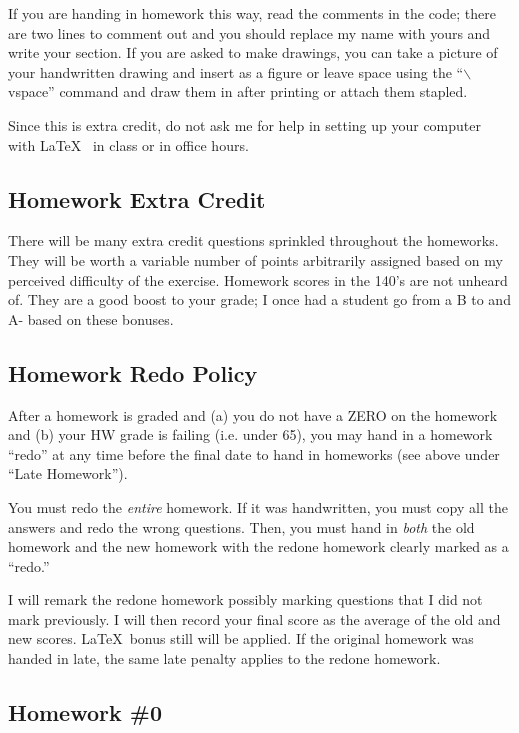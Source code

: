 \documentclass[12pt]{article}
\newcommand{\qu}[1]{``#1''}
\begin{document}
If you are handing in homework this way, read the comments in the code; there are two lines to comment out and you should replace my name with yours and write your section. If you are asked to make drawings, you can take a picture of your handwritten drawing and insert as a figure or leave space using the \qu{$\backslash$vspace} command and draw them in after printing or attach them stapled.

Since this is extra credit, do not ask me for help in setting up your computer with \LaTeX~ in class or in office hours.

\subsection*{Homework Extra Credit}

There will be many extra credit questions sprinkled throughout the homeworks. They will be worth a variable number of points arbitrarily assigned based on my perceived difficulty of the exercise. Homework scores in the 140's are not unheard of. They are a good boost to your grade; I once had a student go from a B to and A- based on these bonuses.

\subsection*{Homework Redo Policy}

After a homework is graded and (a) you do not have a ZERO on the homework and (b) your HW grade is failing (i.e. under 65), you may hand in a homework \qu{redo} at any time before the final date to hand in homeworks (see above under \qu{Late Homework}). 

You must redo the \textit{entire} homework. If it was handwritten, you must copy all the answers and redo the wrong questions. Then, you must hand in \textit{both} the old homework and the new homework with the redone homework clearly marked as a \qu{redo.}

I will remark the redone homework possibly marking questions that I did not mark previously. I will then record your final score as the average of the old and new scores. \LaTeX~bonus still will be applied. If the original homework was handed in late, the same late penalty applies to the redone homework.

\subsection*{Homework \#0}
\end{document}
